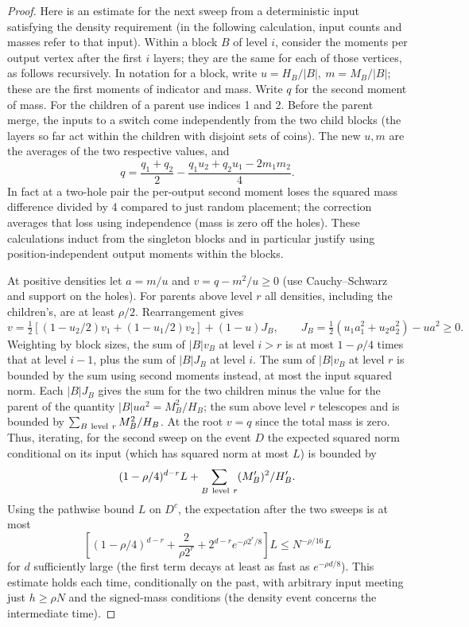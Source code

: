 \begin{proof}
Here is an estimate for the next sweep from a deterministic input satisfying the density requirement (in the following calculation, input counts and masses refer to that input). Within a block \(B\) of level \(i\), consider the moments per output vertex after the first \(i\) layers; they are the same for each of those vertices, as follows recursively. In notation for a block, write \(u=H_B/|B|,\ m=M_B/|B|\); these are the first moments of indicator and mass. Write \(q\) for the second moment of mass. For the children of a parent use indices 1 and 2. Before the parent merge, the inputs to a switch come independently from the two child blocks (the layers so far act within the children with disjoint sets of coins). The new \(u,m\) are the averages of the two respective values, and
\[
q=\frac{q_1+q_2}{2}-\frac{q_1 u_2+q_2 u_1-2m_1m_2}{4}.
\]
In fact at a two-hole pair the per-output second moment loses the squared mass difference divided by 4 compared to just random placement; the correction averages that loss using independence (mass is zero off the holes). These calculations induct from the singleton blocks and in particular justify using position-independent output moments within the blocks.

At positive densities let \(a=m/u\) and \(v=q-m^2/u\ge 0\) (use Cauchy--Schwarz and support on the holes). For parents above level \(r\) all densities, including the children's, are at least \(\rho/2\). Rearrangement gives
\[
v=\tfrac12[(1-u_2/2)v_1+(1-u_1/2)v_2]+(1-u)J_B,\qquad
J_B=\tfrac12(u_1 a_1^2+u_2 a_2^2)-u a^2\ge 0.
\]
Weighting by block sizes, the sum of \(|B|v_B\) at level \(i>r\) is at most \(1-\rho/4\) times that at level \(i-1\), plus the sum of \(|B|J_B\) at level \(i\). The sum of \(|B|v_B\) at level \(r\) is bounded by the sum using second moments instead, at most the input squared norm. Each \(|B|J_B\) gives the sum for the two children minus the value for the parent of the quantity \(|B|u a^2=M_B^2/H_B\); the sum above level \(r\) telescopes and is bounded by \(\sum_{B\ {\rm level}\ r} M_B^2/H_B\). At the root \(v=q\) since the total mass is zero. Thus, iterating, for the second sweep on the event \(D\) the expected squared norm conditional on its input (which has squared norm at most \(L\)) is bounded by
\[
(1-\rho/4)^{d-r}L+\sum_{B\ {\rm level}\ r} (M_B')^2/H_B'.
\]
Using the pathwise bound \(L\) on \(D^c\), the expectation after the two sweeps is at most
\[
\left[(1-\rho/4)^{d-r}+\frac{2}{\rho 2^r}+2^{d-r}e^{-\rho2^r/8}\right]L\le N^{-\rho/16} L
\]
for \(d\) sufficiently large (the first term decays at least as fast as \(e^{-\rho d/8}\)). This estimate holds each time, conditionally on the past, with arbitrary input meeting just \(h\ge\rho N\) and the signed-mass conditions (the density event concerns the intermediate time).
\end{proof}

